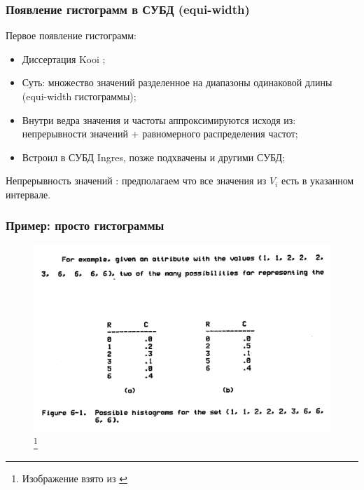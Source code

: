 \documentclass{beamer}
\begin{document}
\begin{frame}
\frametitle{Появление гистограмм в СУБД (equi-width)}

Первое появление гистограмм:
\begin{itemize}
  \setlength\itemsep{1em}
  \item Диссертация Kooi \cite{Kooi1980};
  \item Суть: множество значений разделенное на диапазоны одинаковой длины (equi-width гистограммы);
  \item Внутри ведра значения и частоты аппроксимируются исходя из: непрерывности значений + равномерного распределения частот;
  \item Встроил в СУБД Ingres, позже подхвачены и другими СУБД;
\end{itemize}

Непрерывность значений \cite{Poosala1996}: предполагаем что все значения из $V_i$ есть в указанном интервале.

\end{frame}

\begin{frame}
\frametitle{Пример: просто гистограммы}

\begin{figure}[htb]
\includegraphics[width=\textwidth,height=0.79\textheight,keepaspectratio]{histogram-example-kooi.png} 
\footnote{\tiny{Изображение взято из \cite{Kooi1980}}}
\end{figure}

\end{frame}
\end{document}
